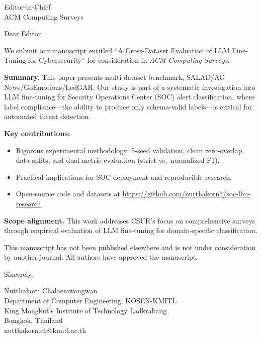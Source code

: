 \documentclass[11pt]{letter}
\begin{document}
\begin{letter}{Editor-in-Chief \\ ACM Computing Surveys}

\opening{Dear Editor,}

We submit our manuscript entitled ``A Cross-Dataset Evaluation of LLM Fine-Tuning for Cybersecurity'' for consideration in \textit{ACM Computing Surveys}.

\textbf{Summary.} This paper presents multi-dataset benchmark, SALAD/AG News/GoEmotions/LedGAR. Our study is part of a systematic investigation into LLM fine-tuning for Security Operations Center (SOC) alert classification, where label compliance---the ability to produce only schema-valid labels---is critical for automated threat detection.

\textbf{Key contributions:}
\begin{itemize}
\item Rigorous experimental methodology: 5-seed validation, clean zero-overlap data splits, and dual-metric evaluation (strict vs.\ normalized F1).
\item Practical implications for SOC deployment and reproducible research.
\item Open-source code and datasets at \url{https://github.com/nutthakorn7/soc-llm-research}.
\end{itemize}

\textbf{Scope alignment.} This work addresses CSUR's focus on comprehensive surveys through empirical evaluation of LLM fine-tuning for domain-specific classification.

This manuscript has not been published elsewhere and is not under consideration by another journal. All authors have approved the manuscript.

\closing{Sincerely,}

Nutthakorn Chalaemwongwan \\
Department of Computer Engineering, KOSEN-KMITL \\
King Mongkut's Institute of Technology Ladkrabang \\
Bangkok, Thailand \\
nutthakorn.ch@kmitl.ac.th

\end{letter}
\end{document}
